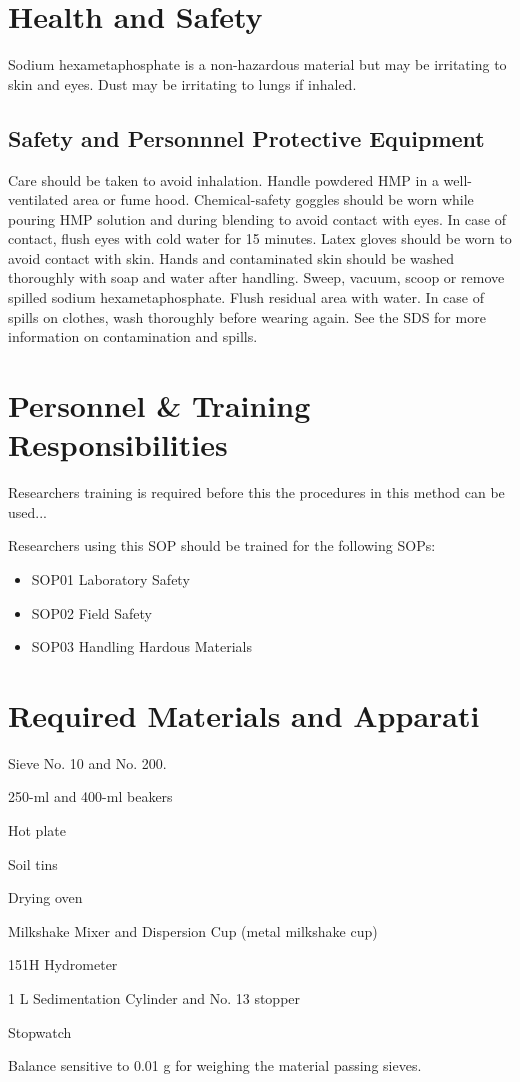 \documentclass[12pt]{../SOP3_alpha}
\begin{document}
\section{Health and Safety}

\NP Sodium hexametaphosphate is a non-hazardous material but may be irritating to skin and eyes. Dust may be irritating to lungs if inhaled. 

\subsection*{Safety and Personnnel Protective Equipment}

\NP Care should be taken to avoid inhalation. Handle powdered HMP in a well-ventilated area or fume hood. Chemical-safety goggles should be worn while pouring HMP solution and during blending to avoid contact with eyes. In case of contact, flush eyes with cold water for 15 minutes. Latex gloves should be worn to avoid contact with skin. Hands and contaminated skin should be washed thoroughly with soap and water after handling. Sweep, vacuum, scoop or remove spilled sodium hexametaphosphate. Flush residual area with water. In case of spills on clothes, wash thoroughly before wearing again. See the SDS for more information on contamination and spills.

\section{Personnel \& Training Responsibilities}

\NP Researchers training is required before this the procedures in this method can be used... 

\NP Researchers using this SOP should be trained for the following SOPs:

\begin{itemize}
  \item SOP01 Laboratory Safety
  \item SOP02 Field Safety
  \item SOP03 Handling Hardous Materials
\end{itemize}

\section{Required Materials and Apparati}

\begin{enumerate*}
	\item Sieve No. 10 and No. 200.
	\item 250-ml and 400-ml beakers
	\item Hot plate
	\item Soil tins
	\item Drying oven
	\item Milkshake Mixer and Dispersion Cup (metal milkshake cup)	
	\item 151H Hydrometer
	\item 1 L Sedimentation Cylinder and No. 13 stopper 
	\item Stopwatch
	\item Balance sensitive to 0.01 g for weighing the material passing sieves.
\end{enumerate*}
\end{document}
